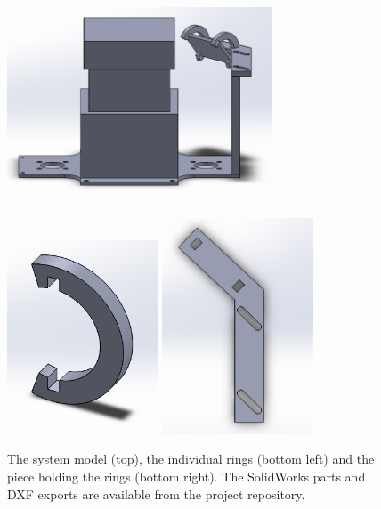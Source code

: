 \documentclass[12pt,oneside,a4paper]{book}
\begin{document}
\begin{figure}
  \centering
  \includegraphics[width=0.7\textwidth]{figs/mirrorassembly}\\
  ~\\
  \includegraphics[width=0.4\textwidth]{figs/mirrorholder}
  \includegraphics[width=0.4\textwidth]{figs/mirrorholdermount}
  \caption{The system model (top), the individual rings (bottom left) and the piece holding the rings (bottom right). The SolidWorks parts and DXF exports are available from the project repository.}
  \label{fig:mirror-solidworks}
\end{figure}
\end{document}
